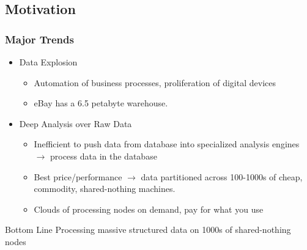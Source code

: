 \documentclass{beamer}
\begin{document}





\subsection{Motivation}
\label{sec:motivation}

\begin{frame}
  \frametitle{Major Trends}
  \begin{itemize}
  \item Data Explosion
    \begin{itemize}
    \item Automation of business processes, proliferation of digital
      devices
    \item eBay has a 6.5 petabyte warehouse.
    \end{itemize}
   \item Deep Analysis over Raw Data
     \begin{itemize}
     \item Inefficient to push data from database into specialized analysis
       engines $\rightarrow$ process data in the database
     \item Best price/performance $\rightarrow$ data partitioned across 100-1000s
       of cheap, commodity, shared-nothing machines.
     \item Clouds of processing nodes on demand, pay for what you use
    \end{itemize}
  \end{itemize}
  \begin{block}{Bottom Line}
    Processing massive structured data on 1000s of shared-nothing
    nodes
  \end{block}
\end{frame}
\end{document}
